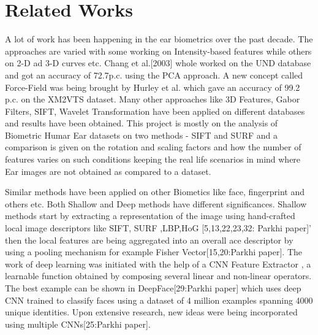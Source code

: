 \chapter{Related Works}
\label{sec:related}

A lot of work has been happening in the ear biometrics over the past decade. The approaches are varied with some working on Intensity-based features while others on 2-D ad 3-D curves etc. Chang et al.[2003] whole worked on the UND database and got an accuracy of 72.7p.c. using the PCA approach. A new concept called Force-Field was being brought by Hurley et al. which gave an accuracy of 99.2 p.c. on the XM2VTS dataset. Many other approaches like 3D Features, Gabor Filters, SIFT, Wavelet Transformation have been applied on different databases and results have been obtained. This project is mostly on the analysis of Biometric Humar Ear datasets on two methods - SIFT and SURF and a comparison is given on the rotation and scaling factors and how the number of features varies on such conditions keeping the real life scenarios in mind where Ear images are not obtained as compared to a dataset.

Similar methods have been applied on other Biometics like face, fingerprint and others etc. Both Shallow and Deep methods have different significances. Shallow methods start by extracting a representation of the image using hand-crafted local image descriptors like SIFT, SURF ,LBP,HoG [5,13,22,23,32: Parkhi paper]' then the local features are being aggregated into an overall ace descriptor by using a pooling mechanism for example Fisher Vector[15,20:Parkhi paper]. The work of deep learning was initiated with the help of a CNN Feature Extractor , a learnable function obtained by composing several linear and non-linear operators. The best example can be shown in DeepFace[29:Parkhi paper] which uses deep CNN trained to classify faces using a dataset of 4 million examples spanning 4000 unique identities. Upon extensive research, new ideas were being incorporated using multiple CNNs[25:Parkhi paper].
